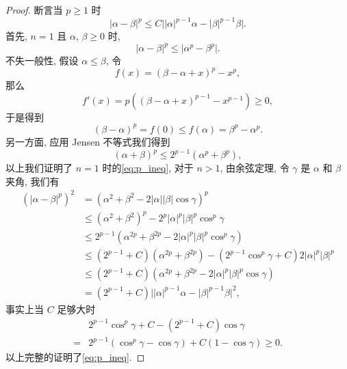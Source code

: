 \documentclass[oneside,longtitle]{LZUthesis}
\numberwithin{equation}{chapter}
\newcommand*\abs[1]{\lvert#1\rvert}
\begin{document}
\begin{proof}
	断言当 $p \geq 1 $ 时
	\begin{equation}\label{eq:p_ineq}
		\abs{\alpha-\beta}^p \leq C\abs{\abs{\alpha}^{p-1}\alpha - \abs{\beta}^{p-1}\beta}.
	\end{equation}
	首先, $n = 1$ 且 $\alpha$, $\beta \geq 0$ 时,
	\begin{equation*}
		\abs{\alpha-\beta}^p \leq \abs{\alpha^p - \beta^p}.
	\end{equation*}
	不失一般性, 假设 $\alpha \leq \beta$, 令
	\begin{equation*}
		f(x) = (\beta-\alpha+x)^p - x^p,
	\end{equation*}
	那么
	\begin{equation*}
		f'(x) = p\left((\beta-\alpha+x)^{p-1} - x^{p-1}\right) \geq 0,
	\end{equation*}
	于是得到
	\begin{equation*}
		\left(\beta-\alpha\right)^p = f(0) \leq f(\alpha) = \beta^p - \alpha^p.
	\end{equation*}
	另一方面, 应用 Jensen 不等式我们得到
	\begin{equation*}
		\left(\alpha+\beta\right)^p \leq 2^{p-1}\left(\alpha^p + \beta^p\right),
	\end{equation*}
	以上我们证明了 $n = 1$ 时的\cref{eq:p_ineq},
	对于 $n > 1$, 由余弦定理, 令 $\gamma$ 是 $\alpha$ 和 $\beta$ 夹角, 我们有
	\begin{equation*}
		\begin{split}
			\left(\abs{\alpha-\beta}^p\right)^2
			&= \left(\alpha^2 + \beta^2 - 2 \abs{\alpha}\abs{\beta}\cos{\gamma}\right)^p\\
			&\leq \left(\alpha^2+\beta^2\right)^p - 2^p\abs{\alpha}^p\abs{\beta}^p\cos^p{\gamma}\\
			&\leq 2^{p-1}\left(\alpha^{2p} + \beta^{2p} - 2\abs{\alpha}^p\abs{\beta}^p\cos^p{\gamma}\right)\\
			&\leq \left(2^{p-1}+C\right)\left(\alpha^{2p} + \beta^{2p}\right)
			- \left(2^{p-1}\cos^p{\gamma}+C\right)2\abs{\alpha}^p\abs{\beta}^p\\
			&\leq \left(2^{p-1}+C\right)\left(\alpha^{2p} + \beta^{2p} - 2\abs{\alpha}^p\abs{\beta}^p\cos{\gamma}\right)\\
			&= \left(2^{p-1}+C\right)\abs{\abs{\alpha}^{p-1}\alpha - \abs{\beta}^{p-1}\beta}^2,
		\end{split}
	\end{equation*}
	事实上当 $C$ 足够大时
	\begin{equation*}
		\begin{split}
			& 2^{p-1}\cos^p{\gamma} + C - \left(2^{p-1}+C\right)\cos{\gamma}\\
			={} & 2^{p-1}\left(\cos^p{\gamma} - \cos{\gamma}\right) + C\left(1-\cos{\gamma}\right)
			\geq 0.
		\end{split}
	\end{equation*}
	以上完整的证明了\cref{eq:p_ineq}.


\end{proof}
\end{document}
